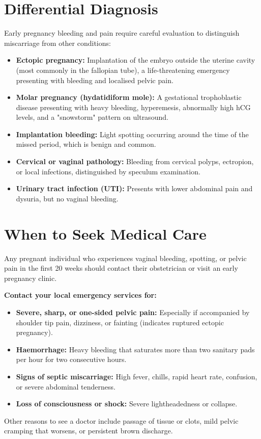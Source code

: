 \section*{Differential Diagnosis}
Early pregnancy bleeding and pain require careful evaluation to distinguish miscarriage from other conditions:
\begin{itemize}
    \item \textbf{Ectopic pregnancy:} Implantation of the embryo outside the uterine cavity (most commonly in the fallopian tube), a life-threatening emergency presenting with bleeding and localised pelvic pain.
    \item \textbf{Molar pregnancy (hydatidiform mole):} A gestational trophoblastic disease presenting with heavy bleeding, hyperemesis, abnormally high hCG levels, and a "snowstorm" pattern on ultrasound.
    \item \textbf{Implantation bleeding:} Light spotting occurring around the time of the missed period, which is benign and common.
    \item \textbf{Cervical or vaginal pathology:} Bleeding from cervical polyps, ectropion, or local infections, distinguished by speculum examination.
    \item \textbf{Urinary tract infection (UTI):} Presents with lower abdominal pain and dysuria, but no vaginal bleeding.
\end{itemize}

\section*{When to Seek Medical Care}
Any pregnant individual who experiences vaginal bleeding, spotting, or pelvic pain in the first 20 weeks should contact their obstetrician or visit an early pregnancy clinic.

\textbf{Contact your local emergency services for:}
\begin{itemize}
    \item \textbf{Severe, sharp, or one-sided pelvic pain:} Especially if accompanied by shoulder tip pain, dizziness, or fainting (indicates ruptured ectopic pregnancy).
    \item \textbf{Haemorrhage:} Heavy bleeding that saturates more than two sanitary pads per hour for two consecutive hours.
    \item \textbf{Signs of septic miscarriage:} High fever, chills, rapid heart rate, confusion, or severe abdominal tenderness.
    \item \textbf{Loss of consciousness or shock:} Severe lightheadedness or collapse.
\end{itemize}
Other reasons to see a doctor include passage of tissue or clots, mild pelvic cramping that worsens, or persistent brown discharge.

